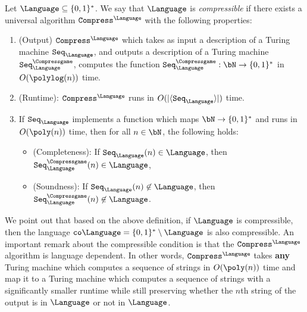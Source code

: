 \begin{definition} \label{def:compressiblelanguage}
Let $\Language \subseteq \{0,1\}^*$. We say that $\Language$ is \textit{compressible} if there exists a universal algorithm $\texttt{Compress}^{\Language}$ with the following properties:
\begin{enumerate}
	\item (Output) $\texttt{Compress}^{\Language}$ which takes as input a description of a Turing machine $\texttt{Seq}_{\Language}$, and outputs a description of a Turing machine $\texttt{Seq}_{\Language}^{\Compressgame}$, computes the function $\texttt{Seq}_{\Language}^{\Compressgame}: \bN \rightarrow \{0,1\}^*$ in $O(\polylog(n))$ time.
	\item (Runtime): $\texttt{Compress}^{\Language}$ runs in $O(|\langle \texttt{Seq}_{\Language}\rangle|)$ time. 
	\item If $\texttt{Seq}_{\Language}$ implements a function which maps $\bN \rightarrow \{0,1\}^*$ and runs in $O(\poly(n))$ time, then for all $n \in \bN$, the following holds:
	\begin{itemize}
		\item (Completeness): If $\texttt{Seq}_{\Language}(n) \in \Language$, then $ \texttt{Seq}_{\Language}^{\Compressgame}(n) \in \Language$, 
		\item (Soundness): If $\texttt{Seq}_{\Language}(n) \not\in \Language$, then $ \texttt{Seq}_{\Language}^{\Compressgame}(n) \not\in \Language$.
	\end{itemize}
\end{enumerate}
\end{definition}
We point out that based on the above definition, if $\Language$ is compressible, then the language $\texttt{co}\Language = \{0,1\}^* \setminus \Language$ is also compressible. An important remark about the compressible condition is that the $\texttt{Compress}^{\Language}$ algorithm is language dependent. In other words, $\texttt{Compress}^{\Language}$ takes \textbf{any} Turing machine which computes a sequence of strings in $O(\poly(n))$ time and map it to a Turing machine which computes a sequence of strings with a significantly smaller runtime while still preserving whether the $n$th string of the output is in $\Language$ or not in $\Language$. 




